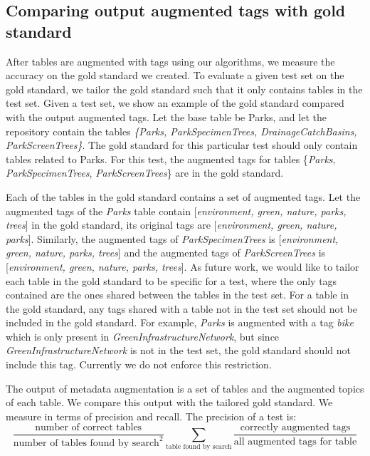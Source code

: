 \subsection{Comparing output augmented tags with gold standard}
\label{ssec:ComparingOutputAugmentedTagsWithGoldStandard}

After tables are augmented with tags using our algorithms, we measure the accuracy on the gold standard we created. To evaluate a given test set on the gold standard, we tailor the gold standard such that it only contains tables in the test set. Given a test set, we show an example of the gold standard compared with the output augmented tags. Let the base table be Parks, and let the repository contain the tables  \textit{\{Parks, ParkSpecimenTrees, DrainageCatchBasins, ParkScreenTrees\}}. The gold standard for this particular test should only contain tables related to Parks. For this test, the augmented tags for tables \{\textit{Parks}, \textit{ParkSpecimenTrees}, \textit{ParkScreenTrees}\} are in the gold standard.

Each of the tables in the gold standard contains a set of augmented tags. Let the augmented tags of the \textit{Parks} table contain [\textit{environment, green, nature, parks, trees}] in the gold standard, its original tags are [\textit{environment, green, nature, parks}]. Similarly, the augmented tags of \textit{ParkSpecimenTrees} is [\textit{environment, green, nature, parks, trees}] and the augmented tags of \textit{ParkScreenTrees} is [\textit{environment, green, nature, parks, trees}]. As future work, we would like to tailor each table in the gold standard to be specific for a test, where the only tags contained are the ones shared between the tables in the test set. For a table in the gold standard, any tags shared with a table not in the test set should not be included in the gold standard. For example, \textit{Parks} is augmented with a tag \textit{bike} which is only present in \textit{GreenInfrastructureNetwork}, but since \textit{GreenInfrastructureNetwork} is not in the test set, the gold standard should not include this tag. Currently we do not enforce this restriction.

The output of metadata augmentation is a set of tables and the augmented topics of each table. We compare this output with the tailored gold standard. We measure in terms of precision and recall. The precision of a test is:
\[
\frac{\text{number of correct tables}}{\text{number of tables found by search}^{2}}\sum\limits _{\text{table found by search}}\frac{\text{correctly augmented tags}}{\text{all augmented tags for table}}
\]

